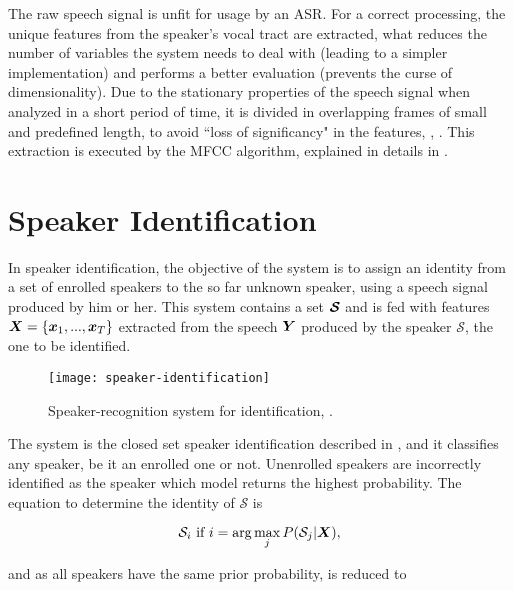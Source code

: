The raw speech signal is unfit for usage by an ASR. For a correct processing, the unique features from the speaker's vocal tract are extracted, what reduces the number of variables the system needs to deal with (leading to a simpler implementation) and performs a better evaluation (prevents the curse of dimensionality). Due to the stationary properties of the speech signal when analyzed in a short period of time, it is divided in overlapping frames of small and predefined length, to avoid ``loss of significancy" in the features, , . This extraction is executed by the MFCC algorithm, explained in details in .

\section{Speaker Identification}
\label{sec:speaker-identification}

In speaker identification, the objective of the system is to assign an identity from a set of enrolled speakers to the so far unknown speaker, using a speech signal produced by him or her. This system contains a set $\boldsymbol{\mathcal{S}}$ and is fed with features $\boldsymbol{X} = \{\boldsymbol{x}_1, ..., \boldsymbol{x}_T\}$ extracted from the speech $\boldsymbol{Y}$ produced by the speaker $\mathcal{S}$, the one to be identified.

\begin{figure}[ht]
    \centering
    \texttt{[image: speaker-identification]}
    \caption{Speaker-recognition system for identification, .}
    \label{fig:speaker-identification}
\end{figure}

\noindent The system is the closed set speaker identification described in , and it classifies any speaker, be it an enrolled one or not. Unenrolled speakers are incorrectly identified as the speaker which model returns the highest probability. The equation to determine the identity of $\mathcal{S}$ is

\begin{equation}
    \mathcal{S}_i \text{ if } i = \arg\max_j \postprob{\mathcal{S}_j}{\dvec{X}},
    \label{eq:decision_speaker_identification}
\end{equation}

\noindent and as all speakers have the same prior probability,  is reduced to

